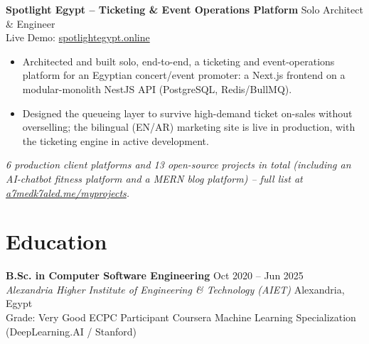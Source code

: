 \documentclass[10pt,letterpaper]{article}
\newcommand{\sectionrule}{\vspace{-1pt}{\color{hairline}\hrule height 0.6pt}\vspace{2pt}}
\newcommand{\entryHeading}[4]{%
  \textbf{#1} \hfill {\small\color{muted}#2}\\
  {\small\color{muted}\textit{#3}} \hfill {\small\color{muted}#4}\\[0pt]
}
\newcommand{\lineHeading}[2]{%
  \textbf{#1} \hfill {\small\color{muted}#2}\\[0pt]
}
\newcommand{\linkLine}[3]{{\footnotesize\color{muted}#1: }{\footnotesize\href{#2}{#3}}\\[0pt]}
\newcommand{\sectionNote}[1]{{\footnotesize\color{muted}\itshape#1}}
\begin{document}
\lineHeading{Spotlight Egypt -- Ticketing \& Event Operations Platform}{Solo Architect \& Engineer}
\linkLine{Live Demo}{https://spotlightegypt.online/}{spotlightegypt.online}
{\small
\begin{itemize}
    \item Architected and built solo, end-to-end, a ticketing and event-operations platform for an Egyptian
    concert/event promoter: a Next.js frontend on a modular-monolith NestJS API (PostgreSQL, Redis/BullMQ).
    \item Designed the queueing layer to survive high-demand ticket on-sales without overselling; the bilingual
    (EN/AR) marketing site is live in production, with the ticketing engine in active development.
\end{itemize}
}

\vspace{2pt}
\sectionNote{6 production client platforms and 13 open-source projects in total (including an AI-chatbot
fitness platform and a MERN blog platform) -- full list at
\href{https://a7medk7aled.me/myprojects}{a7medk7aled.me/myprojects}.}

\section*{Education}
\sectionrule
\entryHeading{B.Sc. in Computer Software Engineering}{Oct 2020 -- Jun 2025}{Alexandria Higher Institute of Engineering \& Technology (AIET)}{Alexandria, Egypt}
{\small Grade: Very Good \quad\textperiodcentered\quad ECPC Participant
\quad\textperiodcentered\quad Coursera Machine Learning Specialization (DeepLearning.AI / Stanford)}
\end{document}
